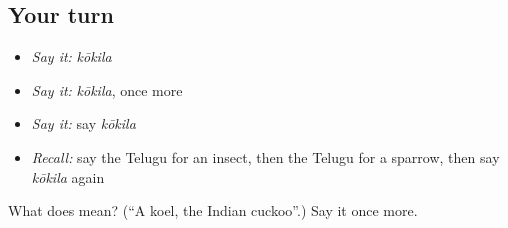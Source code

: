 \subsection*{Your turn}
\begin{itemize}
\raggedright
  \item \emph{Say it:} \emph{kōkila}
  \item \emph{Say it:} \emph{kōkila}, once more
  \item \emph{Say it:} say \emph{kōkila}
  \item \emph{Recall:} say the Telugu for an insect, then the Telugu for a sparrow, then say \emph{kōkila} again
\end{itemize}

\begin{tcolorbox}[breakable,colback=teal!4,colframe=teal!35!black,title={Before you move on}]
What does  mean? (\textquotedblleft{}A koel, the Indian cuckoo\textquotedblright{}.) Say it once more.
\end{tcolorbox}
